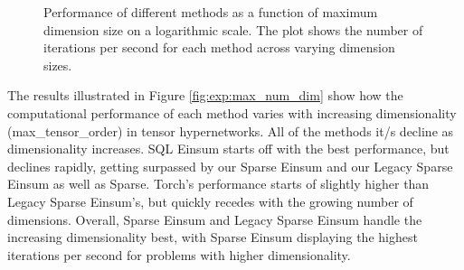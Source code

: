 \begin{figure}[H]
    \caption{Performance of different methods as a function of maximum dimension size on a logarithmic scale.
        The plot shows the number of iterations per second for each method across varying dimension sizes.}
    \label{fig:exp:max_dim_size}
\end{figure}

\noindent
The results illustrated in Figure \ref{fig:exp:max_num_dim} show how the computational performance
of each method varies with increasing dimensionality (max\_tensor\_order) in tensor hypernetworks.
All of the methods it/s decline as dimensionality increases. SQL Einsum starts off with the
best performance, but declines rapidly, getting surpassed by our Sparse Einsum and our Legacy Sparse
Einsum as well as Sparse. Torch's performance starts of slightly higher than Legacy Sparse Einsum's,
but quickly recedes with the growing number of dimensions. Overall, Sparse Einsum and Legacy Sparse
Einsum handle the increasing dimensionality best, with Sparse Einsum displaying the highest iterations
per second for problems with higher dimensionality.

